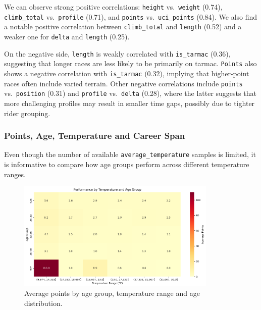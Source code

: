 \documentclass[a4paper, twoside]{article}
\begin{document}
We can observe strong positive correlations: \texttt{height} vs.\ \texttt{weight} (0.74), \texttt{climb\_total} vs.\ \texttt{profile} (0.71), and \texttt{points} vs.\ \texttt{uci\_points} (0.84). We also find a notable positive correlation between \texttt{climb\_total} and \texttt{length} (0.52) and a weaker one for \texttt{delta} and \texttt{length} (0.25).

On the negative side, \texttt{length} is weakly correlated with \texttt{is\_tarmac} (0.36), suggesting that longer races are less likely to be primarily on tarmac. \texttt{Points} also shows a negative correlation with \texttt{is\_tarmac} (0.32), implying that higher-point races often include varied terrain. Other negative correlations include \texttt{points} vs.\ \texttt{position} (0.31) and \texttt{profile} vs.\ \texttt{delta} (0.28), where the latter suggests that more challenging profiles may result in smaller time gaps, possibly due to tighter rider grouping.
\subsubsection{Points, Age, Temperature and Career Span}
Even though the number of available \texttt{average\_temperature} samples is limited, it is informative to compare how age groups perform across different temperature ranges.

\begin{figure}[ht]
    \centering
    \includegraphics[width=0.85\textwidth]{assets/perf_age_group.png}   
    \caption{Average points by age group, temperature range and age distribution.}
    \label{fig:temperature-age}
\end{figure}
\end{document}
